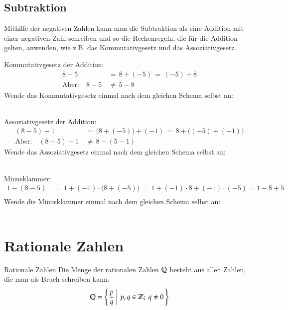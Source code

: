 \subsection{Subtraktion}
Mithilfe der negativen Zahlen kann man die Subtraktion als eine Addition mit einer negativen Zahl schreiben und so die Rechenregeln, die für die Addition gelten, anwenden, wie z.B. das Kommutativgesetz und das Assoziativgesetz.
\begin{example} Kommutativgesetz der Addition:
	\begin{align*}
					8 - 5		&\,=\, 8 + (-5) \,=\, (-5) + 8\\
		\text{Aber:}\quad 8 - 5		&\,\neq\, 5 - 8
	\end{align*}
	Wende das Kommutativgesetz einmal nach dem gleichen Schema selbst an:\\
	\\
\end{example}
\begin{example} Assoziativgesetz der Addition:
	\begin{align*}
					(8 - 5) - 1			&\,=\, \bigl(8 + (-5)\bigr) + (-1) \,=\, 8 + \bigl( (-5) + (-1)\bigr)\\
		\text{Aber:}\quad (8 - 5) - 1	&\,\neq\, 8 - (5 - 1)
	\end{align*}
	Wende das Assoziativgesetz einmal nach dem gleichen Schema selbst an:\\
	\\
\end{example}
\begin{example} Minusklammer:
	\begin{align*}
					1 -(8 - 5)			&\,=\, 1 + (-1)\cdot\bigl(8 + (-5)\bigr)\,=\, 1 + (-1)\cdot 8 + (-1)\cdot (-5) = 1 - 8 + 5\\
	\end{align*}
	Wende die Minusklammer einmal nach dem gleichen Schema selbst an:\\
	\\
\end{example}

\section{Rationale Zahlen}
\begin{defn}{Rationale Zahlen}
	Die Menge der rationalen Zahlen $\mathbb{Q}$ besteht aus allen Zahlen, die man als Bruch schreiben kann.
	\begin{align*}
		\mathbb{Q} = \left\{\left. \frac{p}{q} ~\right|~ p,q \in \mathbb{Z};~ q \neq 0\, \right\}
	\end{align*}
	
\end{defn}



